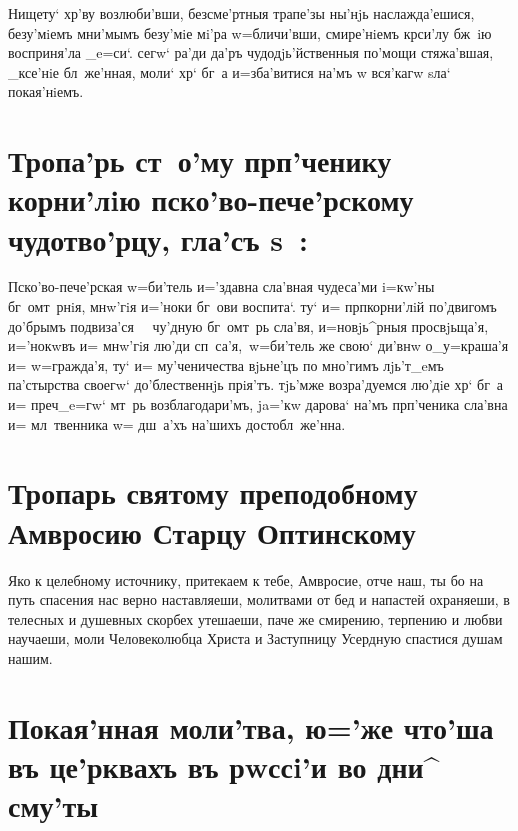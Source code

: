 \documentclass[12pt,twoside,xdvi,a6paper,civil=times]{hipbook}
\renewcommand{\*}{\raise3pt\hbox{\footnotesize*}}
\begin{document}
Нищету` хр'ву возлюби'вши, без\-сме'рт\-ныя трапе'зы ны'нjь наслажда'ешися,
без\-у'\-мi\-емъ мни'мымъ безу'мiе мi'ра w=бличи'вши, сми\-ре'\-нiемъ кр си'лу
бж~iю восприня'ла _e=си`. сегw` ра'ди да'ръ чудодjь'йственныя по'\-мо\-щи
стяжа'вшая, _ксе'нiе бл~же'нная, моли` хр` бг~а и=зба'витися на'мъ w\т
вся'кагw sла` покая'нiемъ.

\section[\cs Тропа'рь ст~. прп\дмч. корни'лiю]
{Тропа'рь ст~о'му прп'ченику корни'лiю пско'во-пече'рскому чудотво'рцу,
гла'съ s~:}

Пско'во-пече'рская w=би'тель \* и='здавна сла'в\-ная чудеса'ми i=кw'ны
бг~омт~рнiя, \* мнw'\-гiя и='ноки бг~ови воспита`. ту` и= прп кор\-ни'\-лiй \*
по'двигомъ до'брымъ подвиза'ся~~\* чу'д\-ную бг~омт~рь сла'вя, \* и=новjь^рныя
про\-свjь\-ща'я, \* и='нокwвъ и= мнw'гiя лю'ди сп~са'я,\,\* w=би'тель же свою` ди'внw
о_у=краша'я и= w=граж\-да'я, \* ту` и= му'ченичества вjьне'цъ \* по мно'гимъ
лjь'т_eмъ па'стырства своегw` до'б\-лест\-вен\-нjь прiя'тъ. \* тjь'мже возра'дуемся
лю'дiе \* хр` бг~а и= преч _e=гw` мт~рь воз\-бла\-го\-да\-ри'мъ, \* ja='кw
дарова` на'мъ прп'ченика сла'вна \* и= мл~твенника w= дш~а'хъ на'шихъ
достобл~же'нна.

\civil
\section[\civil Тропарь прп. Амвросию Оптинскому]
{Тропарь святому преподобному\\Амвросию Старцу Оптинскому}

Яко к целебному источнику, притекаем к тебе, Амвросие, отче наш, ты бо на
путь спасения нас верно наставляеши, молитвами от бед и напастей охраняеши, в
телесных и душевных скорбех утешаеши, паче же смирению, терпению и любви
научаеши, моли Человеколюбца Христа и Заступницу Усердную спастися душам
нашим.

\cs
\section[\cs Покая'нная моли'тва:]
{Покая'нная моли'тва, ю='же что'ша въ це'рквахъ въ рwссi'и во дни^ сму'ты}
\end{document}
